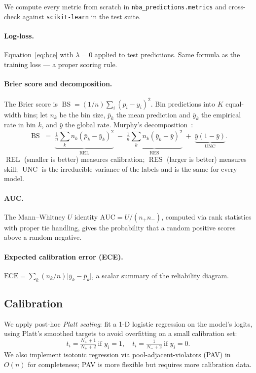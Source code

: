 \documentclass[11pt]{article}
\newcommand{\bs}{\operatorname{BS}}
\newcommand{\rel}{\operatorname{REL}}
\newcommand{\res}{\operatorname{RES}}
\newcommand{\unc}{\operatorname{UNC}}
\begin{document}
We compute every metric from scratch in \texttt{nba\_predictions.metrics}
and cross-check against \texttt{scikit-learn} in the test suite.

\paragraph{Log-loss.} Equation~\eqref{eq:bce} with $\lambda = 0$
applied to test predictions. Same formula as the training loss --- a
proper scoring rule.

\paragraph{Brier score and decomposition.} The Brier score is
$\bs = (1/n) \sum_i (p_i - y_i)^2$. Bin predictions into $K$ equal-width
bins; let $n_k$ be the bin size, $\bar p_k$ the mean prediction and
$\bar y_k$ the empirical rate in bin $k$, and $\bar y$ the global rate.
Murphy's decomposition~\cite{murphy1973new}:
\begin{equation}\label{eq:brierdec}
  \bs \;=\; \underbrace{\tfrac{1}{n}\sum_k n_k (\bar p_k - \bar y_k)^2}_{\rel}
  \;-\; \underbrace{\tfrac{1}{n}\sum_k n_k (\bar y_k - \bar y)^2}_{\res}
  \;+\; \underbrace{\bar y(1 - \bar y)}_{\unc}.
\end{equation}
$\rel$ (smaller is better) measures calibration; $\res$ (larger is
better) measures skill; $\unc$ is the irreducible variance of the
labels and is the same for every model.

\paragraph{AUC.} The Mann--Whitney $U$ identity
$\mathrm{AUC} = U / (n_+ n_-)$, computed via rank statistics with proper
tie handling, gives the probability that a random positive scores above
a random negative.

\paragraph{Expected calibration error (ECE).}
$\mathrm{ECE} = \sum_k (n_k / n) \lvert \bar y_k - \bar p_k\rvert$,
a scalar summary of the reliability diagram.

\subsection{Calibration}

We apply post-hoc \emph{Platt scaling}: fit a 1-D logistic regression on
the model's logits, using Platt's smoothed targets to avoid overfitting
on a small calibration set:
\[
  t_i = \tfrac{N_+ + 1}{N_+ + 2}\ \text{if } y_i = 1, \quad
  t_i = \tfrac{1}{N_- + 2}\ \text{if } y_i = 0.
\]
We also implement isotonic regression via pool-adjacent-violators (PAV)
in $O(n)$ for completeness; PAV is more flexible but requires more
calibration data.
\end{document}
